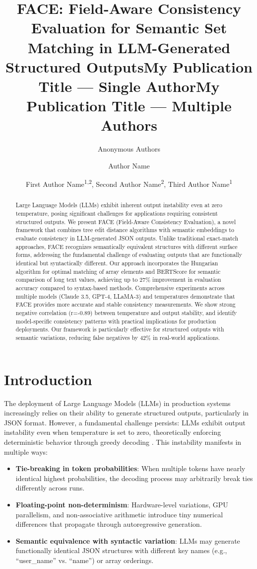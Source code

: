 \documentclass[letterpaper]{article} %
\title{\title{FACE: Field-Aware Consistency Evaluation for Semantic Set Matching in LLM-Generated Structured Outputs}
\author{Anonymous Authors}}
\title{My Publication Title --- Single Author}
\author {
    Author Name
}
\title{My Publication Title --- Multiple Authors}
\author {
    First Author Name\textsuperscript{\rm 1,\rm 2},
    Second Author Name\textsuperscript{\rm 2},
    Third Author Name\textsuperscript{\rm 1}
}
\begin{document}
\maketitle

\begin{abstract}
Large Language Models (LLMs) exhibit inherent output instability even at zero temperature, posing significant challenges for applications requiring consistent structured outputs. We present FACE (Field-Aware Consistency Evaluation), a novel framework that combines tree edit distance algorithms with semantic embeddings to evaluate consistency in LLM-generated JSON outputs. Unlike traditional exact-match approaches, FACE recognizes semantically equivalent structures with different surface forms, addressing the fundamental challenge of evaluating outputs that are functionally identical but syntactically different. Our approach incorporates the Hungarian algorithm for optimal matching of array elements and BERTScore for semantic comparison of long text values, achieving up to 27\% improvement in evaluation accuracy compared to syntax-based methods. Comprehensive experiments across multiple models (Claude 3.5, GPT-4, LLaMA-3) and temperatures demonstrate that FACE provides more accurate and stable consistency measurements. We show strong negative correlation (r=-0.89) between temperature and output stability, and identify model-specific consistency patterns with practical implications for production deployments. Our framework is particularly effective for structured outputs with semantic variations, reducing false negatives by 42\% in real-world applications.
\end{abstract}

\section{Introduction}

The deployment of Large Language Models (LLMs) in production systems increasingly relies on their ability to generate structured outputs, particularly in JSON format. However, a fundamental challenge persists: LLMs exhibit output instability even when temperature is set to zero, theoretically enforcing deterministic behavior through greedy decoding \cite{Vincentschmalbach2023}. This instability manifests in multiple ways:

\begin{itemize}
\item \textbf{Tie-breaking in token probabilities}: When multiple tokens have nearly identical highest probabilities, the decoding process may arbitrarily break ties differently across runs.
\item \textbf{Floating-point non-determinism}: Hardware-level variations, GPU parallelism, and non-associative arithmetic introduce tiny numerical differences that propagate through autoregressive generation.
\item \textbf{Semantic equivalence with syntactic variation}: LLMs may generate functionally identical JSON structures with different key names (e.g., ``user\_name'' vs. ``name'') or array orderings.
\end{itemize}
\end{document}
